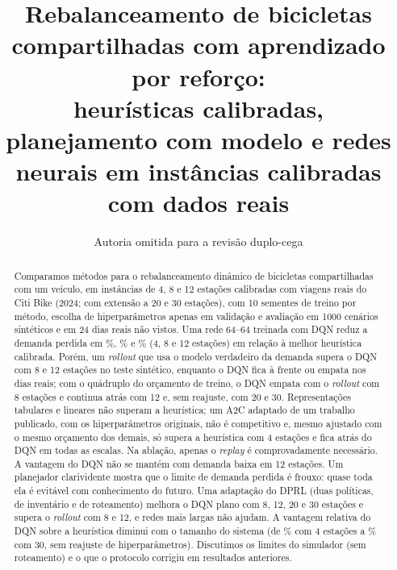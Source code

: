 \documentclass[12pt,a4paper]{article}
\title{Rebalanceamento de bicicletas compartilhadas com aprendizado por refor\c{c}o:\\
heur\'isticas calibradas, planejamento com modelo e redes neurais em inst\^ancias calibradas com dados reais}
\author{Autoria omitida para a revis\~ao duplo-cega}
\date{}
\begin{document}
\maketitle

\begin{abstract}
Comparamos m\'etodos para o rebalanceamento din\^amico de bicicletas compartilhadas com um ve\'iculo, em inst\^ancias de 4, 8 e 12 esta\c{c}\~oes
calibradas com viagens reais do Citi Bike (2024; com extens\~ao a 20 e 30 esta\c{c}\~oes), com 10 sementes de treino por m\'etodo, escolha de hiperpar\^ametros apenas em valida\c{c}\~ao e
avalia\c{c}\~ao em 1000 cen\'arios sint\'eticos e em 24 dias reais n\~ao vistos. Uma rede 64--64 treinada com DQN reduz a demanda perdida em
\redA\%, \redB\% e \redC\% (4, 8 e 12 esta\c{c}\~oes) em rela\c{c}\~ao \`a melhor heur\'istica calibrada. Por\'em, um \emph{rollout} que usa o modelo
verdadeiro da demanda supera o DQN com 8 e 12 esta\c{c}\~oes no teste sint\'etico, enquanto o DQN fica \`a frente ou empata nos dias reais;
com o qu\'adruplo do or\c{c}amento de treino, o DQN empata com o \emph{rollout} com 8 esta\c{c}\~oes e continua atr\'as com 12 e, sem reajuste, com 20 e 30.
Representa\c{c}\~oes tabulares e lineares n\~ao superam a heur\'istica; um A2C adaptado de um trabalho publicado, com os hiperpar\^ametros originais, n\~ao \'e competitivo e, mesmo ajustado com o mesmo or\c{c}amento dos demais, s\'o supera a heur\'istica com 4 esta\c{c}\~oes e fica atr\'as do DQN em todas as escalas.
Na abla\c{c}\~ao, apenas o \emph{replay} \'e comprovadamente necess\'ario. A vantagem do DQN n\~ao se mant\'em com demanda baixa em 12 esta\c{c}\~oes. Um planejador clarividente mostra que o limite de demanda perdida \'e frouxo: quase toda ela \'e evit\'avel com conhecimento do futuro.
Uma adapta\c{c}\~ao do DPRL (duas pol\'iticas, de invent\'ario e de roteamento) melhora o DQN plano com 8, 12, 20 e 30 esta\c{c}\~oes e supera o \emph{rollout} com 8 e 12, e redes mais largas n\~ao ajudam. A vantagem relativa do DQN sobre a heur\'istica diminui com o tamanho do sistema (de \scRedFiveA\% com 4 esta\c{c}\~oes a \scRedFiveE\% com 30, sem reajuste de hiperpar\^ametros).
Discutimos os limites do simulador (sem roteamento) e o que o protocolo corrigiu em resultados anteriores.
\end{abstract}
\end{document}
